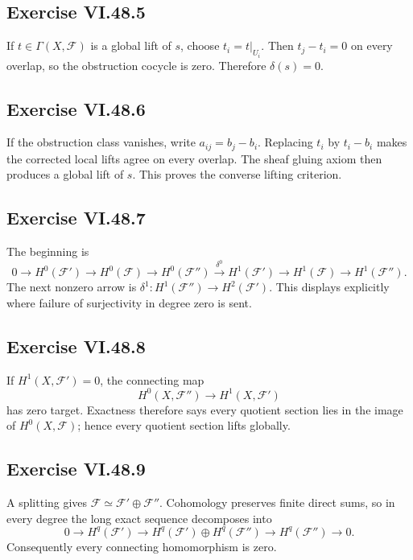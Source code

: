 \subsection*{Exercise VI.48.5}
\begin{solution}
If \(t\in\Gamma(X,\mathcal F)\) is a global lift of \(s\), choose \(t_i=t|_{U_i}\).  Then \(t_j-t_i=0\) on every overlap, so the obstruction cocycle is zero.  Therefore \(\delta(s)=0\).
\end{solution}

\subsection*{Exercise VI.48.6}
\begin{solution}
If the obstruction class vanishes, write \(a_{ij}=b_j-b_i\).  Replacing \(t_i\) by \(t_i-b_i\) makes the corrected local lifts agree on every overlap.  The sheaf gluing axiom then produces a global lift of \(s\).  This proves the converse lifting criterion.
\end{solution}

\subsection*{Exercise VI.48.7}
\begin{solution}
The beginning is
\[
0\to H^0(\mathcal F')\to H^0(\mathcal F)\to H^0(\mathcal F'')
 \xrightarrow{\delta^0}H^1(\mathcal F')\to H^1(\mathcal F)\to H^1(\mathcal F'').
\]
The next nonzero arrow is \(\delta^1:H^1(\mathcal F'')\to H^2(\mathcal F')\).  This displays explicitly where failure of surjectivity in degree zero is sent.
\end{solution}

\subsection*{Exercise VI.48.8}
\begin{solution}
If \(H^1(X,\mathcal F')=0\), the connecting map
\[
H^0(X,\mathcal F'')\to H^1(X,\mathcal F')
\]
has zero target.  Exactness therefore says every quotient section lies in the image of \(H^0(X,\mathcal F)\); hence every quotient section lifts globally.
\end{solution}

\subsection*{Exercise VI.48.9}
\begin{solution}
A splitting gives \(\mathcal F\simeq\mathcal F'\oplus\mathcal F''\).  Cohomology preserves finite direct sums, so in every degree the long exact sequence decomposes into
\[
0\to H^q(\mathcal F')\to H^q(\mathcal F')\oplus H^q(\mathcal F'')\to H^q(\mathcal F'')\to0.
\]
Consequently every connecting homomorphism is zero.
\end{solution}

